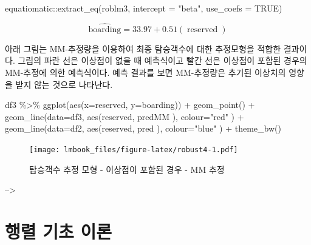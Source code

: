 \documentclass[
  10pt,
]{book}
\newenvironment{Shaded}{\begin{snugshade}}{\end{snugshade}}
\newcommand{\AttributeTok}[1]{\textcolor[rgb]{0.77,0.63,0.00}{#1}}
\newcommand{\ConstantTok}[1]{\textcolor[rgb]{0.00,0.00,0.00}{#1}}
\newcommand{\FunctionTok}[1]{\textcolor[rgb]{0.00,0.00,0.00}{#1}}
\newcommand{\NormalTok}[1]{#1}
\newcommand{\SpecialCharTok}[1]{\textcolor[rgb]{0.00,0.00,0.00}{#1}}
\newcommand{\StringTok}[1]{\textcolor[rgb]{0.31,0.60,0.02}{#1}}
\theoremstyle{definition}
\theoremstyle{definition}
\theoremstyle{definition}
\theoremstyle{definition}
\theoremstyle{remark}
\begin{document}
\begin{Shaded}
\begin{Highlighting}[]
\NormalTok{equatiomatic}\SpecialCharTok{::}\FunctionTok{extract\_eq}\NormalTok{(roblm3, }\AttributeTok{intercept =} \StringTok{"beta"}\NormalTok{,  }\AttributeTok{use\_coefs =} \ConstantTok{TRUE}\NormalTok{)}
\end{Highlighting}
\end{Shaded}

\[
\operatorname{\widehat{boarding}} = 33.97 + 0.51(\operatorname{reserved})
\]

아래 그림는 MM-추정량을 이용하여 최종 탐승객수에 대한 추정모형을 적합한 결과이다. 그림의 파란 선은 이상점이 없을 때 예측식이고 빨간 선은 이상점이 포함된 경우의 MM-추정에 의한 예측식이다. 예측 결과를 보면 MM-추정량은 추기된 이상치의 영향을 받지 않는 것으로 나타난다.

\begin{Shaded}
\begin{Highlighting}[]
\NormalTok{df3 }\SpecialCharTok{\%\textgreater{}\%} \FunctionTok{ggplot}\NormalTok{(}\FunctionTok{aes}\NormalTok{(}\AttributeTok{x=}\NormalTok{reserved, }\AttributeTok{y=}\NormalTok{boarding)) }\SpecialCharTok{+} 
  \FunctionTok{geom\_point}\NormalTok{() }\SpecialCharTok{+} 
  \FunctionTok{geom\_line}\NormalTok{(}\AttributeTok{data=}\NormalTok{df3, }\FunctionTok{aes}\NormalTok{(reserved, predMM ), }\AttributeTok{colour=}\StringTok{"red"}\NormalTok{  ) }\SpecialCharTok{+}
  \FunctionTok{geom\_line}\NormalTok{(}\AttributeTok{data=}\NormalTok{df2, }\FunctionTok{aes}\NormalTok{(reserved, pred ), }\AttributeTok{colour=}\StringTok{"blue"}\NormalTok{  ) }\SpecialCharTok{+} 
  \FunctionTok{theme\_bw}\NormalTok{()}
\end{Highlighting}
\end{Shaded}

\begin{figure}
\centering
\texttt{[image: lmbook\_files/figure-latex/robust4-1.pdf]}
\caption{\label{fig:robust4}탑승객수 추정 모형 - 이상점이 포함된 경우 - MM 추정}
\end{figure}

--\textgreater{}

\hypertarget{appendix-appendix}{%
\appendix {}}


\hypertarget{matrixalgebra}{%
\chapter{행렬 기초 이론}\label{matrixalgebra}}
\end{document}
